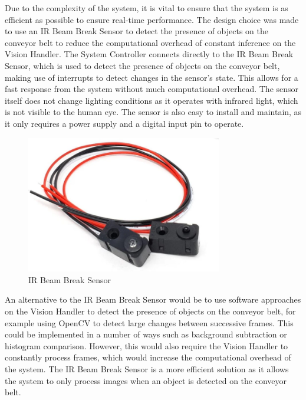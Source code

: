 Due to the complexity of the system, it is vital to ensure that the system is as efficient as possible to ensure real-time performance. The design choice was made to use an IR Beam Break Sensor \cite{breakbeamsensor} to detect the presence of objects on the conveyor belt to reduce the computational overhead of constant inference on the Vision Handler. The System Controller connects directly to the IR Beam Break Sensor, which is used to detect the presence of objects on the conveyor belt, making use of interrupts to detect changes in the sensor's state. This allows for a fast response from the system without much computational overhead. The sensor itself does not change lighting conditions as it operates with infrared light, which is not visible to the human eye. The sensor is also easy to install and maintain, as it only requires a power supply and a digital input pin to operate.

\begin{figure}[H]
    \begin{minipage}[h]{0.95\textwidth}
        \centering
        \includegraphics[height=6cm]{imgs/parts/breakbeam.jpg}
        \caption{IR Beam Break Sensor \cite{breakbeamsensor}}
    \end{minipage}
\end{figure}

An alternative to the IR Beam Break Sensor would be to use software approaches on the Vision Handler to detect the presence of objects on the conveyor belt, for example using OpenCV \cite{home_2024} to detect large changes between successive frames. This could be implemented in a number of ways such as background subtraction or histogram comparison. However, this would also require the Vision Handler to constantly process frames, which would increase the computational overhead of the system. The IR Beam Break Sensor is a more efficient solution as it allows the system to only process images when an object is detected on the conveyor belt.

